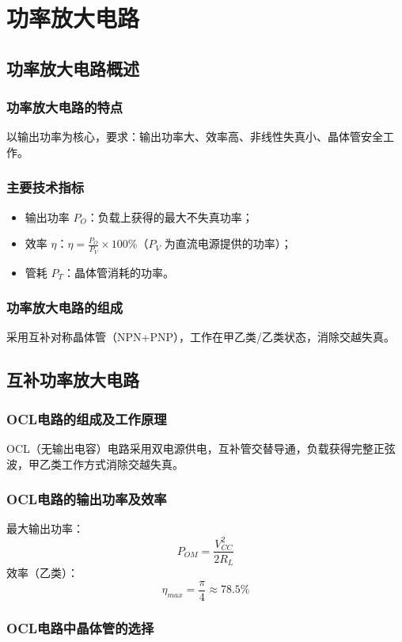 \chapter{功率放大电路}

\section{功率放大电路概述}
\subsection{功率放大电路的特点}
以输出功率为核心，要求：输出功率大、效率高、非线性失真小、晶体管安全工作。

\subsection{主要技术指标}
\begin{itemize}
    \item 输出功率 $P_O$：负载上获得的最大不失真功率；
    \item 效率 $\eta$：$\eta = \frac{P_O}{P_V} \times 100\%$（$P_V$ 为直流电源提供的功率）；
    \item 管耗 $P_T$：晶体管消耗的功率。
\end{itemize}

\subsection{功率放大电路的组成}
采用互补对称晶体管（NPN+PNP），工作在甲乙类/乙类状态，消除交越失真。

\section{互补功率放大电路}
\subsection{OCL电路的组成及工作原理}
OCL（无输出电容）电路采用双电源供电，互补管交替导通，负载获得完整正弦波，甲乙类工作方式消除交越失真。

\subsection{OCL电路的输出功率及效率}
最大输出功率：
\[ P_{OM} = \frac{V_{CC}^2}{2R_L} \]
效率（乙类）：
\[ \eta_{max} = \frac{\pi}{4} \approx 78.5\% \]

\subsection{OCL电路中晶体管的选择}
